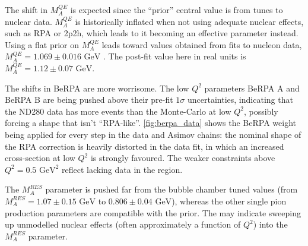 The shift in $M_A^{QE}$ is expected since the ``prior'' central value is from tunes to nuclear data\cite{ccqe_tuning}. $M_A^{QE}$ is historically inflated\cite{k2k_ccqe_carbon,k2k_ccqe_oxygen,minos_ccqe_iron,miniboone_nu_ccqe} when not using adequate nuclear effects, such as RPA or 2p2h, which leads to it becoming an effective parameter instead. Using a flat prior on $M_A^{QE}$ leads toward values obtained from fits to nucleon data, $M_A^{QE}=1.069\pm0.016\text{ GeV}$ \cite{maqe_fit}. The post-fit value here in real units is $M_A^{QE}=1.12\pm0.07\text{ GeV}$.

The shifts in BeRPA are more worrisome. The low $Q^2$ parameters BeRPA A and BeRPA B are being pushed above their pre-fit $1\sigma$ uncertainties, indicating that the ND280 data has more events than the Monte-Carlo at low $Q^2$, possibly forcing a shape that isn't ``RPA-like''. \autoref{fig:berpa_data} shows the BeRPA weight being applied for every step in the data and Asimov chains: the nominal shape of the RPA correction is heavily distorted in the data fit, in which an increased cross-section at low $Q^2$ is strongly favoured. The weaker constraints above $Q^2=0.5\text{ GeV}^2$ reflect lacking data in the region.

The $M_A^{RES}$ parameter is pushed far from the bubble chamber tuned values (from $M_A^{RES}=1.07\pm0.15\text{ GeV}$ to $0.806\pm0.04\text{ GeV}$), whereas the other single pion production parameters are compatible with the prior. The may indicate sweeping up unmodelled nuclear effects (often approximately a function of $Q^2$) into the $M_A^{RES}$ parameter.

